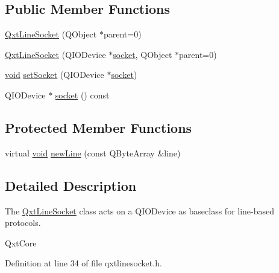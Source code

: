 \subsection*{Public Member Functions}
\begin{DoxyCompactItemize}
\item 
\hyperlink{class_qxt_line_socket_a55a747a9b8397d29def74c44cab3044f}{Qxt\-Line\-Socket} (Q\-Object $\ast$parent=0)
\item 
\hyperlink{class_qxt_line_socket_a8898ab211a16c112a14fe321bbea857b}{Qxt\-Line\-Socket} (Q\-I\-O\-Device $\ast$\hyperlink{class_qxt_line_socket_a614f041caa5be6ea64b16b4a5e84f21b}{socket}, Q\-Object $\ast$parent=0)
\item 
\hyperlink{group___u_a_v_objects_plugin_ga444cf2ff3f0ecbe028adce838d373f5c}{void} \hyperlink{class_qxt_line_socket_aab492ac02c2a862c3e07f3fbd3478052}{set\-Socket} (Q\-I\-O\-Device $\ast$\hyperlink{class_qxt_line_socket_a614f041caa5be6ea64b16b4a5e84f21b}{socket})
\item 
Q\-I\-O\-Device $\ast$ \hyperlink{class_qxt_line_socket_a614f041caa5be6ea64b16b4a5e84f21b}{socket} () const 
\end{DoxyCompactItemize}
\subsection*{Protected Member Functions}
\begin{DoxyCompactItemize}
\item 
virtual \hyperlink{group___u_a_v_objects_plugin_ga444cf2ff3f0ecbe028adce838d373f5c}{void} \hyperlink{class_qxt_line_socket_a7be369281c2a86afd72813c6c92b397c}{new\-Line} (const Q\-Byte\-Array \&line)
\end{DoxyCompactItemize}


\subsection{Detailed Description}
The \hyperlink{class_qxt_line_socket}{Qxt\-Line\-Socket} class acts on a Q\-I\-O\-Device as baseclass for line-\/based protocols. 

Qxt\-Core 

Definition at line 34 of file qxtlinesocket.\-h.



